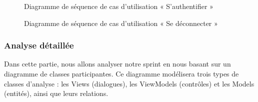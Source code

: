 \begin{figure}[H]
  \centering
  \caption{Diagramme de séquence de cas d'utilisation « S'authentifier »}
  \label{fig:sequence_login}
\end{figure}

\begin{figure}[H]
  \centering
  \caption{Diagramme de séquence de cas d'utilisation « Se déconnecter »}
  \label{fig:sequence_logout}
\end{figure}


\subsubsection{Analyse détaillée}
Dans cette partie, nous allons analyser notre sprint en nous basant sur un diagramme de classes participantes. Ce diagramme modélisera trois types de classes d'analyse : les Views (dialogues), les ViewModels (contrôles) et les Models (entités), ainsi que leurs relations.


